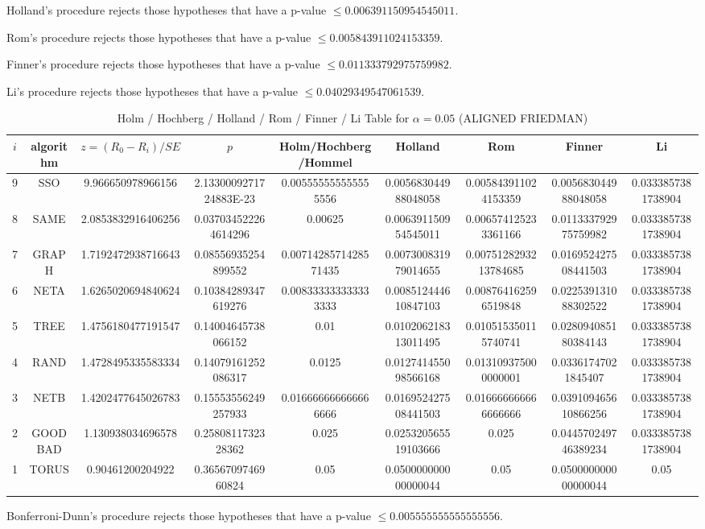 \documentclass[a4paper,10pt]{article}
\begin{document}
\begin{landscape}
Holland's procedure rejects those hypotheses that have a p-value $\le0.006391150954545011$.


Rom's procedure rejects those hypotheses that have a p-value $\le0.005843911024153359$.


Finner's procedure rejects those hypotheses that have a p-value $\le0.011333792975759982$.


Li's procedure rejects those hypotheses that have a p-value $\le0.04029349547061539$.



\newpage

\begin{table}[!htp]
\centering\scriptsize
\caption{Holm / Hochberg / Holland / Rom / Finner / Li Table for $\alpha=0.05$ (ALIGNED FRIEDMAN)}
\begin{tabular}{ccccccccc}
$i$&algorithm&$z=(R_0 - R_i)/SE$&$p$&Holm/Hochberg/Hommel&Holland&Rom&Finner&Li\\
\hline
9& SSO&9.966650978966156&2.1330009271724883E-23&0.005555555555555556&0.005683044988048058&0.005843911024153359&0.005683044988048058&0.0333857381738904\\
8& SAME&2.0853832916406256&0.037034522264614296&0.00625&0.006391150954545011&0.006574125233361166&0.011333792975759982&0.0333857381738904\\
7& GRAPH&1.7192472938716643&0.08556935254899552&0.0071428571428571435&0.007300831979014655&0.0075128293213784685&0.016952427508441503&0.0333857381738904\\
6& NETA&1.6265020694840624&0.10384289347619276&0.008333333333333333&0.008512444610847103&0.008764162596519848&0.022539131088302522&0.0333857381738904\\
5& TREE&1.4756180477191547&0.14004645738066152&0.01&0.010206218313011495&0.010515350115740741&0.028094085180384143&0.0333857381738904\\
4& RAND&1.4728495335583334&0.14079161252086317&0.0125&0.012741455098566168&0.013109375000000001&0.03361747021845407&0.0333857381738904\\
3& NETB&1.4202477645026783&0.15553556249257933&0.016666666666666666&0.016952427508441503&0.016666666666666666&0.039109465610866256&0.0333857381738904\\
2& GOODBAD&1.130938034696578&0.2580811732328362&0.025&0.025320565519103666&0.025&0.044570249746389234&0.0333857381738904\\
1& TORUS&0.90461200204922&0.3656709746960824&0.05&0.050000000000000044&0.05&0.050000000000000044&0.05\\
\hline
\end{tabular}
\end{table}
Bonferroni-Dunn's procedure rejects those hypotheses that have a p-value $\le0.005555555555555556$.



\end{landscape}
\end{document}
